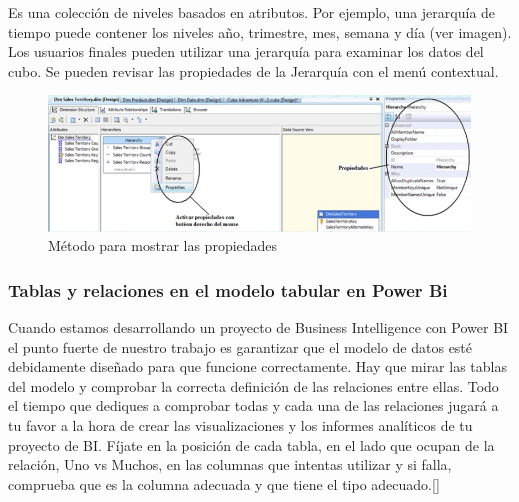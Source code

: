 \documentclass[11pt,a4paper]{article}
\begin{document}
	 	Es una colección de niveles basados en atributos. Por ejemplo, una jerarquía de tiempo puede contener los niveles año, trimestre, mes, semana y día (ver imagen). Los usuarios finales pueden utilizar una jerarquía para examinar los datos del cubo. Se pueden revisar las propiedades de la Jerarquía con el menú contextual.			
	 	\begin{figure}[H]
	 		\begin{center}
	 			\includegraphics[scale=0.75]{./Imagenes/img03}	
	 			\caption{Método para mostrar las propiedades}	
	 		\end{center}
	 	\end{figure}
	 	\newpage
			\subsubsection{Tablas y relaciones en el modelo tabular en Power Bi}
			
			Cuando estamos desarrollando un proyecto de Business Intelligence con Power BI el punto fuerte de nuestro trabajo es garantizar que el modelo de datos esté debidamente diseñado para que funcione correctamente. Hay que mirar las tablas del modelo y comprobar la correcta definición de las relaciones entre ellas.
			Todo el tiempo que dediques a comprobar todas y cada una de las relaciones jugará a tu favor a la hora de crear las visualizaciones y los informes analíticos de tu proyecto de BI. Fíjate en la posición de cada tabla, en el lado que ocupan de la relación, Uno vs Muchos, en las columnas que intentas utilizar y si falla, comprueba que es la columna adecuada y que tiene el tipo adecuado.[\cite{cuevas2016comparing}]
			
\end{document}
